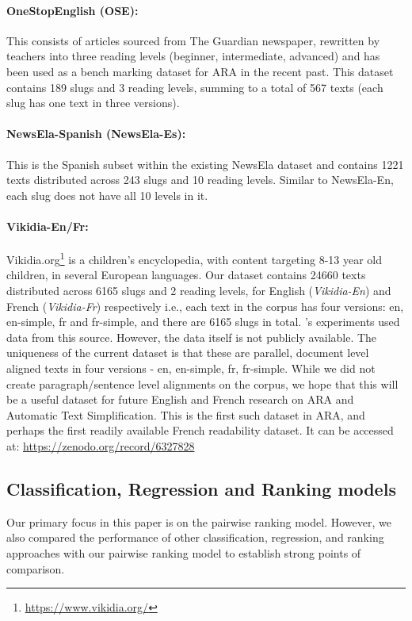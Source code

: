 \documentclass[11pt]{article}
\begin{document}
\paragraph{OneStopEnglish (OSE): } This consists of articles sourced from The Guardian newspaper, rewritten by teachers into three reading levels (beginner, intermediate, advanced) \cite{Vajjala.Lucic-18} and has been used as a bench marking dataset for ARA in the recent past. This dataset contains 189 slugs and 3 reading levels, summing to a total of 567 texts (each slug has one text in three versions).

\paragraph{NewsEla-Spanish (NewsEla-Es): } This is the Spanish subset within the existing NewsEla dataset and contains 1221 texts distributed across 243 slugs and 10 reading levels. Similar to NewsEla-En, each slug does not have all 10 levels in it. 

\paragraph{Vikidia-En/Fr: } Vikidia.org\footnote{\url{https://www.vikidia.org/}} is a children's encyclopedia, with content targeting 8-13 year old children, in several European languages. Our dataset contains 24660 texts distributed across 6165 slugs and 2 reading levels, for English (\textit{Vikidia-En}) and French (\textit{Vikidia-Fr}) respectively i.e., each text in the corpus has four versions: en, en-simple, fr and fr-simple, and there are 6165 slugs in total. 's experiments used data from this source. However, the data itself is not publicly available. The uniqueness of the current dataset is that these are parallel, document level aligned texts in four versions - en, en-simple, fr, fr-simple. While we did not create paragraph/sentence level alignments on the corpus, we hope that this will be a useful dataset for future English and French research on ARA and Automatic Text Simplification. This is the first such dataset in ARA, and perhaps the first readily available French readability dataset. It can be accessed at: \url{https://zenodo.org/record/6327828}


\subsection{Classification, Regression and Ranking models}
Our primary focus in this paper is on the pairwise ranking model. However, we also compared the performance of other classification, regression, and ranking approaches with our pairwise ranking model to establish strong points of comparison.
\end{document}
